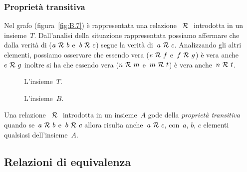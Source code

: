 
\subsubsection{Proprietà transitiva}

 \begin{esempio}

Nel grafo (figura~\ref{fig:B.7}) è rappresentata una relazione~\(~\mathcal{R}~\) 
introdotta 
in un insieme~\(T\). Dall'analisi della situazione rappresentata possiamo
affermare che dalla verità di (\(a ~\mathcal{R}~ b\) e~\(b ~\mathcal{R}~ c\)) segue la verità 
di~\(a 
~\mathcal{R}~ c\). Analizzando gli altri elementi, 
possiamo osservare che essendo vera (\(e ~\mathcal{R}~ f\) e~\(f ~\mathcal{R}~ g\)) è vera 
anche~\(e 
~\mathcal{R}~ g\)
inoltre si ha che essendo vera (\(n ~\mathcal{R}~ m\) e~\(m ~\mathcal{R}~ t\)) è vera anche~\(n 
~\mathcal{R}~ 
t\).
 \end{esempio}

\begin{inaccessibleblock}
 \begin{figure}[t]
\begin{minipage}[b]{.45\textwidth}
 \centering
 
 \caption{L'insieme~\(T\).}\label{fig:B.7}
\end{minipage}\hfil
\begin{minipage}[b]{.45\textwidth}
 \centering
 
 \caption{L'insieme~\(B\).}\label{fig:B.8}
\end{minipage}


\end{figure}
\end{inaccessibleblock}

\begin{definizione}
Una relazione~\(~\mathcal{R}~\) introdotta in un insieme~\(A\) gode della 
\emph{proprietà 
transitiva} quando se~\(a ~\mathcal{R}~ b\) e~\(b ~\mathcal{R}~ c\)
allora risulta anche~\(a ~\mathcal{R}~ c\), con~\(a\), \(b\), \(c\) elementi qualsiasi 
dell'insieme~\(A\).
\end{definizione}


\subsection{Relazioni di equivalenza}
\label{subsec:rel_equivalenza}

